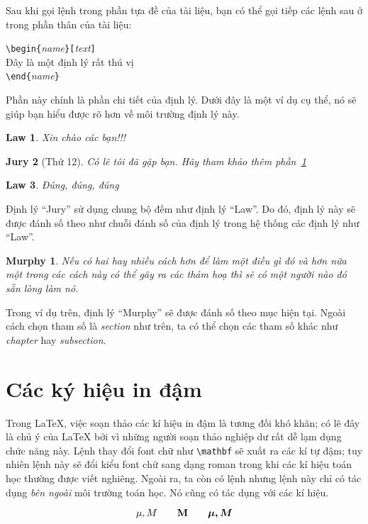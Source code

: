 Sau khi gọi lệnh  trong phần tựa đề của tài liệu, bạn có thể gọi tiếp các lệnh sau ở trong phần thân của tài liệu:
\begin{code}
\verb|\begin{|\emph{name}\verb|}[|\emph{text}\verb|]|\\
Đây là một định lý rất thú vị\\
\verb|\end{|\emph{name}\verb|}|
\end{code}
Phần này chính là phần chi tiết của định lý. Dưới đây là một ví dụ
cụ thể, nó sẽ giúp bạn hiểu được rõ hơn về môi trường định lý này.
\begin{example}
\newtheorem{law}{Law}
\newtheorem{jury}[law]{Jury}
\begin{law} \label{law:box}
Xin chào các bạn!!!
\end{law}
\begin{jury}[Thứ 12]
Có lẽ tôi đã gặp bạn. Hãy tham
khảo thêm
phần~\ref{law:box}\end{jury}
\begin{law}
Đúng, đúng, đúng
\end{law}
\end{example}
Định lý ``Jury'' sử dụng chung bộ đếm như định lý ``Law''. Do đó,
định lý này sẽ được đánh số theo như chuỗi đánh số của định lý
trong hệ thống các định lý như ``Law''.
\begin{example}
\flushleft
\newtheorem{mur}{Murphy}[section]
\begin{mur}
Nếu có hai hay nhiều
cách hơn để làm một
điều gì đó và hơn nữa một
trong các cách này có
thể gây ra các thảm hoạ
thì sẽ có một người
nào đó sẵn lòng làm nó.
\end{mur}
\end{example}
Trong ví dụ trên, định lý ``Murphy'' sẽ được đánh số theo mục hiện
tại. Ngoài cách chọn tham số là \emph{section} như trên, ta có thể
chọn các tham số khác như \emph{chapter} hay \emph{subsection}.

\section{Các ký hiệu in đậm}
 Trong \LaTeX{}, việc soạn thảo các kí hiệu in đậm là tương đối khó khăn; có lẽ đây là chủ ý của \LaTeX{} bởi vì những người soạn thảo nghiệp dư rất dễ lạm dụng chức năng này. Lệnh thay đổi font chữ như \verb|\mathbf| sẽ xuất ra các kí tự đậm; tuy nhiên lệnh này sẽ đổi kiểu font chữ sang dạng roman trong khi các kí hiệu toán học thường được viết nghiêng. Ngoài ra, ta còn có lệnh  nhưng lệnh này chỉ có tác dụng \emph{bên ngoài} môi
trường toán học. Nó cũng có tác dụng với các kí hiệu.
\begin{example}
\begin{displaymath}
\mu, M \qquad \mathbf{M} \qquad
\mbox{\boldmath $\mu, M$}
\end{displaymath}
\end{example}

